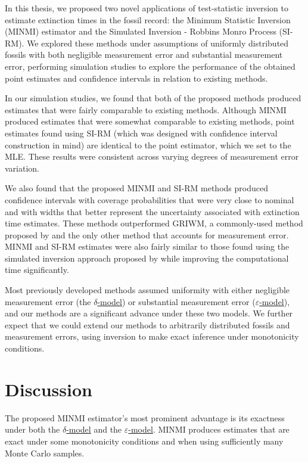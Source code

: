 
In this thesis, we proposed two novel applications of test-statistic inversion to estimate extinction times in the fossil record: the Minimum Statistic Inversion (MINMI) estimator and the Simulated Inversion - Robbins Monro Process (SI-RM). We explored these methods under assumptions of uniformly distributed fossils with both negligible measurement error and substantial measurement error, performing simulation studies to explore the performance of the obtained point estimates and confidence intervals in relation to existing methods.

In our simulation studies, we found that both of the proposed methods produced estimates that were fairly comparable to existing methods. Although MINMI produced estimates that were somewhat comparable to existing methods, point estimates found using SI-RM (which was designed with confidence interval construction in mind) are identical to the point estimator, which we set to the MLE. These results were consistent across varying degrees of measurement error variation.

We also found that the proposed MINMI and SI-RM methods produced confidence intervals with coverage probabilities that were very close to nominal and with widths that better represent the uncertainty associated with extinction time estimates. These methods outperformed GRIWM, a commonly-used method proposed by \citet{Bradshaw2012} and the only other method that accounts for measurement error. MINMI and SI-RM estimates were also fairly similar to those found using the simulated inversion approach proposed by \citet{Huang2019} while improving the computational time significantly.

Most previously developed methods assumed uniformity with either negligible measurement error (the \hyperref[model: no-measurement-error]{$\delta$-model}) or substantial measurement error (\hyperref[model: measurement-error]{$\varepsilon$-model}), and our methods are a significant advance under these two models. We further expect that we could extend our methods to arbitrarily distributed fossils and measurement errors, using inversion to make exact inference under monotonicity conditions.

\section{Discussion}

The proposed MINMI estimator's most prominent advantage is its exactness under both the \hyperref[model: no-measurement-error]{$\delta$-model} and the \hyperref[model: measurement-error]{$\varepsilon$-model}. MINMI produces estimates that are exact under some monotonicity conditions and when using sufficiently many Monte Carlo samples.

